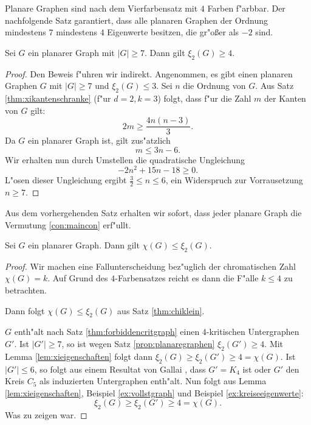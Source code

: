 Planare Graphen sind nach dem Vierfarbensatz \cite{AppelHaken76} mit $4$ Farben f"arbbar. Der nachfolgende Satz garantiert, dass alle planaren Graphen der Ordnung mindestens $7$ mindestens $4$ Eigenwerte besitzen, die gr"o{\ss}er als $-2$ sind.
\begin{proposition}
  Sei $G$ ein planarer Graph mit $|G| \geq 7$. Dann gilt $\xi_{2}(G) \geq 4$.
  \label{prop:planaregraphen}
\end{proposition}

\begin{proof}
  Den Beweis f"uhren wir indirekt. Angenommen, es gibt einen planaren Graphen $G$ mit $|G| \geq 7$ und $\xi_{2}(G) \leq 3$. Sei $n$ die Ordnung von $G$. 
  Aus Satz \ref{thm:xikantenschranke} (f"ur $d=2, k=3$) folgt, dass f"ur die Zahl $m$ der Kanten von $G$ gilt:
  $$2m \geq \frac{4n(n-3)}{3}.$$
  Da $G$ ein planarer Graph ist, gilt zus"atzlich $$ m \leq 3n-6.$$
  Wir erhalten nun durch Umstellen die quadratische Ungleichung $$-2n^{2} +15n -18 \geq 0.$$
  L"osen dieser Ungleichung ergibt $ \frac{3}{2} \leq n \leq 6$, ein Widerspruch zur Vorrausetzung $n\geq 7$.
\end{proof} 
Aus dem vorhergehenden Satz erhalten wir sofort, dass jeder planare Graph die Vermutung \ref{con:maincon} erf"ullt.
\begin{corollary}
  Sei $G$ ein planarer Graph. Dann gilt $\chi(G) \leq \xi_{2}(G) $. 
\end{corollary}
\begin{proof}
  Wir machen eine Fallunterscheidung bez"uglich der chromatischen Zahl $\chi(G)=k$. Auf Grund des $4$-Farbensatzes reicht es dann die F"alle $k\leq 4$ zu betrachten.

   Dann folgt $\chi(G) \leq \xi_{2}(G)$ aus Satz \ref{thm:chiklein}.

   $G$ enth"alt nach Satz \ref{thm:forbiddencritgraph} einen $4$-kritischen Untergraphen $G'$. Ist $|G'| \geq 7$, so ist wegen Satz \ref{prop:planaregraphen} $\xi_{2}(G') \geq 4$. Mit Lemma \ref{lem:xieigenschaften} folgt dann $\xi_{2}(G) \geq \xi_{2}(G') \geq 4 = \chi(G)$.
  Ist $|G'| \leq 6$, so folgt aus einem Resultat von Gallai \cite{Gallai63}, dass $G' = K_4$ ist oder $G'$ den Kreis $C_5$ als induzierten Untergraphen enth"alt. Nun folgt aus Lemma \ref{lem:xieigenschaften}, Beispiel \ref{ex:vollstgraph} und Beispiel \ref{ex:kreiseeigenwerte}: $$\xi_{2}(G) \geq \xi_{2}(G') \geq 4 = \chi(G).$$ 
  Was zu zeigen war.
\end{proof}

